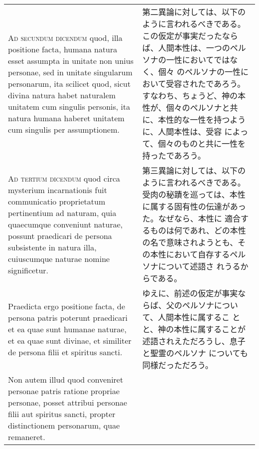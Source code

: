 \documentclass[10pt]{jsarticle} %
\begin{document}
\begin{longtable}{p{21em}p{21em}}
\\



{\scshape Ad secundum dicendum} quod, illa positione facta, humana natura esset
assumpta in unitate non unius personae, sed in unitate singularum
personarum, ita scilicet quod, sicut divina natura habet naturalem
unitatem cum singulis personis, ita natura humana haberet unitatem cum
singulis per assumptionem.


&

第二異論に対しては、以下のように言われるべきである。
この仮定が事実だったならば、人間本性は、一つのペルソナの一性においてではなく、個々
 のペルソナの一性において受容されたであろう。すなわち、ちょうど、神の本
 性が、個々のペルソナと共に、本性的な一性を持つように、人間本性は、受容
 によって、個々のものと共に一性を持ったであろう。

\\



{\scshape Ad tertium dicendum} quod circa mysterium incarnationis fuit communicatio
proprietatum pertinentium ad naturam, quia quaecumque conveniunt
naturae, possunt praedicari de persona subsistente in natura illa,
cuiuscumque naturae nomine significetur. 

&

第三異論に対しては、以下のように言われるべきである。
受肉の秘蹟を巡っては、本性に属する固有性の伝達があった。なぜなら、本性に
 適合するものは何であれ、どの本性の名で意味されようとも、その本性において自存するペルソナについて述語さ
 れうるからである。



\\

Praedicta ergo positione facta,
de persona patris poterunt praedicari et ea quae sunt humanae naturae,
et ea quae sunt divinae, et similiter de persona filii et spiritus
sancti. 


&

ゆえに、前述の仮定が事実ならば、父のペルソナについて、人間本性に属するこ
 とと、神の本性に属することが述語されえただろうし、息子と聖霊のペルソナ
 についても同様だっただろう。

\\


Non autem illud quod conveniret personae patris ratione propriae
personae, posset attribui personae filii aut spiritus sancti, propter
distinctionem personarum, quae remaneret. 


&


\end{longtable}
\end{document}
